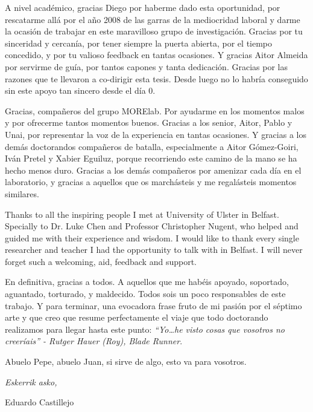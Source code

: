 \begin{acknowledgementslong}
A nivel académico, gracias Diego por haberme dado esta oportunidad, por rescatarme
allá por el año 2008 de las garras de la mediocridad laboral y darme la ocasión
de trabajar en este maravilloso grupo de investigación. Gracias
por tu sinceridad
y cercanía, por tener siempre la puerta abierta, por el tiempo concedido, y por
tu valioso feedback en tantas ocasiones. Y gracias Aitor Almeida por servirme de
guía, por tantos capones y tanta dedicación. Gracias por las razones que te llevaron
a co-dirigir esta tesis. Desde luego no lo habría conseguido sin este apoyo tan
sincero desde el día 0.

Gracias, compañeros del grupo MORElab. Por ayudarme en los momentos malos y por
ofrecerme tantos momentos buenos. Gracias a los senior, Aitor, Pablo y Unai, por
representar la voz de la experiencia en tantas ocasiones. Y gracias a los demás
doctorandos compañeros de batalla, especialmente a Aitor Gómez-Goiri, Iván Pretel
y Xabier Eguiluz, porque recorriendo este camino de la mano se ha hecho menos 
duro. Gracias a los demás compañeros por amenizar cada día en el laboratorio, 
y gracias a aquellos que os marchásteis y me regalásteis momentos similares.

Thanks to all the inspiring people I met at University of Ulster in Belfast.
Specially to Dr. Luke Chen and Professor Christopher Nugent, who helped and
guided me with their experience and wisdom. I would like to thank every single
researcher and teacher I had the opportunity to talk with in Belfast. I will
never forget such a welcoming, aid, feedback and support.

En definitiva, gracias a todos. A aquellos que me habéis apoyado, soportado,
aguantado, torturado, y maldecido. Todos sois un poco responsables de este
trabajo. Y para terminar, una evocadora frase fruto de mi pasión por el séptimo 
arte y que creo que resume perfectamente el viaje que todo doctorando realizamos
para llegar hasta este punto: \textit{``Yo\dots he visto cosas que vosotros no 
creeríais'' - Rutger Hauer (Roy), Blade Runner}.

Abuelo Pepe, abuelo Juan, si sirve de algo, esto va para vosotros.

\begin{flushright}
\textit{Eskerrik asko,}

Eduardo Castillejo

\monthname \ \the\year







\end{flushright}



\end{acknowledgementslong}



